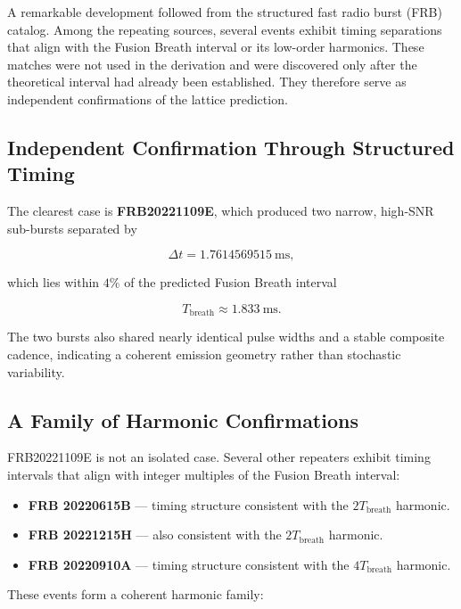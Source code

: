 \documentclass[11pt, letterpaper, openany]{book}
\begin{document}
A remarkable development followed from the structured fast radio burst (FRB) catalog.
Among the repeating sources, several events exhibit timing separations that align with
the Fusion Breath interval or its low-order harmonics. These matches were not used in
the derivation and were discovered only after the theoretical interval had already been
established. They therefore serve as independent confirmations of the lattice prediction.

\subsection{Independent Confirmation Through Structured Timing}

The clearest case is \textbf{FRB20221109E}, which produced two narrow, high-SNR
sub-bursts separated by



\[
\Delta t = 1.7614569515\ \text{ms},
\]



which lies within $4\%$ of the predicted Fusion Breath interval



\[
T_{\text{breath}} \approx 1.833\ \text{ms}.
\]



The two bursts also shared nearly identical pulse widths and a stable composite cadence,
indicating a coherent emission geometry rather than stochastic variability.

\subsection{A Family of Harmonic Confirmations}

FRB20221109E is not an isolated case. Several other repeaters exhibit timing intervals
that align with integer multiples of the Fusion Breath interval:

\begin{itemize}
    \item \textbf{FRB 20220615B} — timing structure consistent with the $2T_{\text{breath}}$ harmonic.
    \item \textbf{FRB 20221215H} — also consistent with the $2T_{\text{breath}}$ harmonic.
    \item \textbf{FRB 20220910A} — timing structure consistent with the $4T_{\text{breath}}$ harmonic.
\end{itemize}

These events form a coherent harmonic family:
\end{document}
